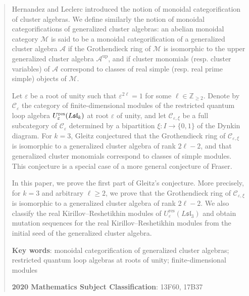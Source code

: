 \documentclass[11pt, reqno]{amsart}
\theoremstyle{plain}
\theoremstyle{definition}
\numberwithin{equation}{section}
\newcommand{\res}{{\rm res}}
\begin{document}
\begin{abstract}
Hernandez and Leclerc introduced the notion of monoidal categorification of cluster algebras. We define similarly the notion of monoidal categorifications of generalized cluster algebras: an abelian monoidal category $\mathcal M$ is said to be a monoidal categorification of a generalized cluster algebra $\mathcal A$ if the Grothendieck ring of $\mathcal M$ is isomorphic to the upper generalized cluster algebra $\mathcal A^{\mathrm{up}}$, and if cluster monomials (resp. cluster variables) of $\mathcal A$ correspond to classes of real simple (resp. real prime simple) objects of $\mathcal M$.

Let $\varepsilon$ be a root of unity such that $\varepsilon^{2\ell}=1$ for some $\ell\in\mathbb{Z}_{\geq 2}$. Denote by $\mathcal{C}_{\varepsilon}$ the category of finite-dimensional modules of the restricted quantum loop algebra $U_\varepsilon^{\res}(L\mathfrak{sl}_k)$ at root $\varepsilon$ of unity, and let $\mathcal{C}_{\varepsilon, \xi}$ be a full subcategory of $\mathcal{C}_{\varepsilon}$ determined by a bipartition $\xi: I \to \{0,1\}$ of the Dynkin diagram. For $k=3$, Gleitz conjectured that the Grothendieck ring of $\mathcal C_{\varepsilon,\xi}$ is isomorphic to a generalized cluster algebra of rank $2\ell-2$, and that generalized cluster monomials correspond to classes of simple modules. This conjecture is a special case of a more general conjecture of Fraser.
 
In this paper, we prove the first part of Gleitz's conjecture. More precisely, for $k=3$ and arbitrary $\ell\ge2$, we prove that the Grothendieck ring of $\mathcal C_{\varepsilon,\xi}$ is isomorphic to a generalized cluster algebra of rank $2\ell-2$. We also classify the real Kirillov--Reshetikhin modules of $U^{\mathrm{res}}_\varepsilon(L\mathfrak{sl}_3)$ and obtain mutation sequences for the real Kirillov--Reshetikhin modules from the initial seed of the generalized cluster algebra.

\hspace{0.15cm}

\noindent
{\bf Key words}: monoidal categorification of generalized cluster algebras; restricted quantum loop algebras at roots of unity;  finite-dimensional modules

\hspace{0.15cm}

\noindent
{\bf 2020 Mathematics Subject Classification}: 13F60,  17B37
\end{abstract}
\end{document}
